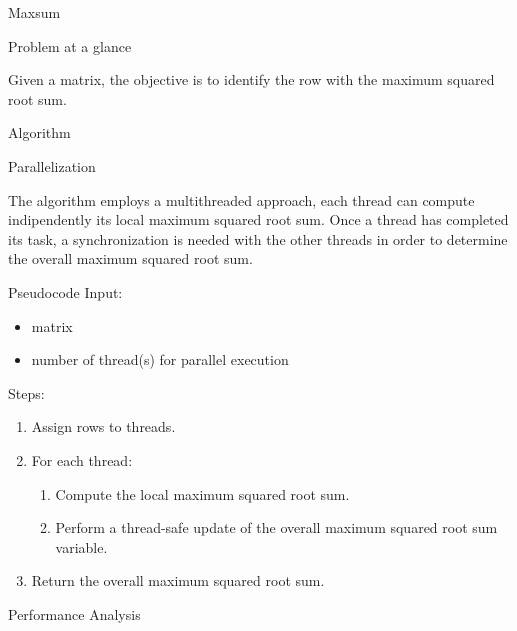 \begin{chapter}{Maxsum}
    \begin{section}{Problem at a glance}
        \par Given a matrix, the objective is to identify the row with the maximum squared root sum.
    \end{section}
    \begin{section}{Algorithm}
        \begin{subsection}{Parallelization}
            \par The algorithm employs a multithreaded approach, each thread can compute indipendently its local maximum squared root sum. Once a thread has completed its task, a synchronization is needed with the other threads in order to determine the overall maximum squared root sum.
        \end{subsection}
        \begin{subsection}{Pseudocode}
            Input:
            \begin{itemize}
                \item matrix
                \item number of thread(s) for parallel execution
            \end{itemize}
            Steps:
            \begin{enumerate}
                \item Assign rows to threads.
                \item For each thread:
                \begin{enumerate}
                    \item Compute the local maximum squared root sum.
                    \item Perform a thread-safe update of the overall maximum squared root sum variable.
                \end{enumerate}
                \item Return the overall maximum squared root sum.
            \end{enumerate}
            
        \end{subsection}
        \clearpage
        \begin{subsection}{Performance Analysis}
            \begin{figure}[ht]
                \centering
                
                \label{fig:maxsum-exectime}

\end{figure}
\end{subsection}
\end{section}
\end{chapter}
